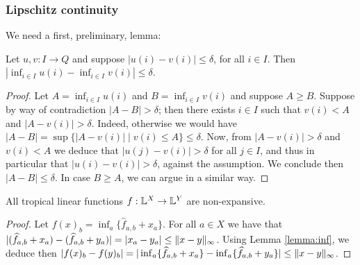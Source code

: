 \newpage



\subsubsection{Lipschitz continuity}





  We need a first, preliminary, lemma:
\begin{lemma}\label{lemma:inf}
Let $u,v: I\to Q$ and suppose $|u(i)-v(i)|\leq \delta$, for all $i\in I$.
Then $|\inf_{i\in I}u(i)- \inf_{i\in I}v(i)|\leq \delta$. 
\end{lemma}
\begin{proof}
Let $A=\inf_{i\in I}u(i)$ and $B=\inf_{i\in I}v(i)$ and suppose $A\geq B$. 
Suppose by way of contradiction $|A-B|> \delta$; then there exists $i\in I$ such that 
$v(i)<A$ and $|A-v(i)|> \delta$. Indeed, otherwise we would have $|A-B|= \sup\{ |A-v(i)|\mid v(i)\leq A\}\leq \delta$. 
Now, from $|A-v(i)|> \delta$ and $v(i)< A$ we deduce that $|u(j)-v(i)|> \delta$ for all $j\in I$, and thus in particular that $|u(i)-v(i)|>\delta$, against the assumption. We conclude then $|A-B| \leq \delta$.
In case $B\geq A$, we can argue in a similar way. 
\end{proof}



\begin{proposition}\label{prop:troplinear}
All tropical linear functions $f: \mathbb{L}^{X}\to \mathbb{L}^{Y}$ are non-expansive.  
\end{proposition}
\begin{proof}
Let $f(x)_{b}=\inf_{a}\{\widehat f_{a,b}+x_{a}\}$.
For all $a\in X$ we have that 
$|(\widehat f_{a,b}+x_{a})- (\widehat f_{a,b}+y_{a})|=
|x_{a}-y_{a}|\leq \lVert x-y\rVert_{\infty}$. Using Lemma \ref{lemma:inf}, we deduce then 
$|f(x)_{b}-f(y)_{b}|=|\inf_{a}\{\widehat f_{a,b}+x_{a}\}-
\inf_{a}\{\widehat f_{a,b}+y_{a}\}|\leq \lVert x-y\rVert_{\infty}$.
\end{proof}






